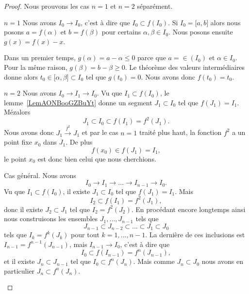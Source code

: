 \begin{proof}
    Nous prouvons les cas \( n=1\) et \( n=2\) séparément.
    \begin{subproof}
    \item[\( n=1\)]
        Nous avons \( I_0\to I_0\), c'est à dire que $I_0\subset f(I_0)$. Si \( I_0=\mathopen[ a , b \mathclose]\) alors nous posons \( a=f(\alpha)\) et \( b=f(\beta)\) pour certains \( \alpha,\beta\in I_0\). Nous posons ensuite \( g(x)=f(x)-x\).

        Dans un premier temps, \( g(\alpha)=a-\alpha\leq 0\) parce que \( a=\in(I_0)\) et \( \alpha\in I_0\). Pour la même raison, \( g(\beta)=b-\beta\geq 0\). Le théorème des valeurs intermédiaires donne alors \( t_0\in \mathopen[ \alpha , \beta \mathclose]\subset I_0\) tel que \( g(t_0)=0\). Nous avons donc \( f(t_0)=t_0\).
    \item[\( n=2\)]
        Nous avons \( I_0\to I_1\to I_0\). Vu que \( I_1\subset f(I_0)\), le lemme~\ref{LemAONBooGZBuYt} donne un segment \( J_1\subset I_0\) tel que \( f(J_1)=I_1\). Mézalors
        \begin{equation}
            J_1\subset I_0\subset f(I_1)=f^2(J_1).
        \end{equation}
        Nous avons donc \( J_1\stackrel{f^2}{\longrightarrow}J_1\) et par le cas \( n=1\) traité plus haut, la fonction \( f^2 \) a un point fixe \( x_0\) dans \( J_1\). De plus
        \begin{equation}
            f(x_0)\in f(J_1)=I_1,
        \end{equation}
        le point \( x_0\) est donc bien celui que nous cherchions.
    \item
        Cas général. Nous avons
        \begin{equation}
            I_0\to I_1\to\ldots\to I_{n-1}\to I_0.
        \end{equation}
        Vu que \( I_1\subset f(I_0)\), il existe \( J_1\subset I_0\) tel que \( f(J_1)=I_1\). Mais
        \begin{equation}
            I_2\subset f(I_1)=f^2(J_1),
        \end{equation}
        donc il existe \( J_2\subset J_1\) tel que \( I_2=f^2(J_2)\). En procédant encore longtemps ainsi nous construisons les ensembles \( J_1,\ldots, J_{n-1}\) tels que
        \begin{equation}
            J_{n-1}\subset J_{n-2}\subset\ldots\subset J_1\subset J_0
        \end{equation}
        tels que \( I_k=f^k(J_k)\) pour tout \( k=1,\ldots, n-1\). La dernière de ces inclusions est \( I_{n-1}=f^{n-1}(J_{n-1})\), mais \( I_{n-1}\to I_0\), c'est à dire que
        \begin{equation}
            I_0\subset f(I_{n-1})=f^n(J_{n-1}),
        \end{equation}
        et il existe \( J_n\subset J_{n-1}\) tel que \( I_0\subset f^n(J_n)\). Mais comme \( J_n\subset J_0\) nous avons en particulier \( J_n\subset f^n(J_n)\).


\end{subproof}
\end{proof}

